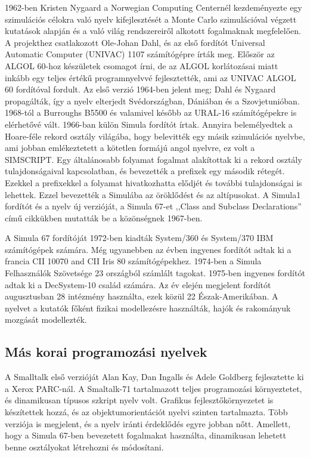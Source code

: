 \documentclass[]{thesis-ekf}
\theoremstyle{definition}
\begin{document}
	1962-ben Kristen Nygaard a Norwegian Computing Centernél kezdeményezte egy szimulációs célokra való nyelv kifejlesztését a Monte Carlo szimulációval végzett kutatások alapján és a való világ rendszereiről alkotott fogalmaknak megfelelően. A projekthez csatlakozott Ole-Johan Dahl, és az első fordítót Universal Automatic Computer (UNIVAC) 1107 számítógépre írták meg. Először az ALGOL 60-hoz készületek csomagot írni, de az ALGOL korlátozásai miatt inkább egy teljes értékű programnyelvvé fejlesztették, ami az UNIVAC ALGOL 60 fordítóval fordult. Az első verzió 1964-ben jelent meg; Dahl és Nygaard propagálták, így a nyelv elterjedt Svédországban, Dániában és a Szovjetunióban. 1968-tól a Burroughs B5500 és valamivel később az URAL-16 számítógépekre is elérhetővé vált. 1966-ban külön Simula fordítót írtak. Annyira belemélyedtek a Hoare-féle rekord osztály világába, hogy belevitték egy másik szimulációs nyelvbe, ami jobban emlékeztetett a kötetlen formájú angol nyelvre, ez volt a SIMSCRIPT. Egy általánosabb folyamat fogalmat alakítottak ki a rekord osztály tulajdonságaival kapcsolatban, és bevezették a prefixek egy második rétegét. Ezekkel a prefixekkel a folyamat hivatkozhatta elődjét és további tulajdonságai is lehettek. Ezzel bevezették a Simulába az öröklődést és az altípusokat. A Simula1 fordítót és a nyelv új verzióját, a Simula 67-et ,,Class and Subclass Declarations'' című cikkükben mutatták be a közönségnek 1967-ben.\cite{Holmevik}
	
	A Simula 67 fordítóját 1972-ben kiadták System/360 és System/370 IBM számítógépek számára. Még ugyanebben az évben ingyenes fordítót adtak ki a francia CII 10070 and CII Iris 80 számítógépekhez. 1974-ben a Simula Felhasználók Szövetsége 23 országból számlált tagokat. 1975-ben ingyenes fordítót adtak ki a DecSystem-10 család számára. Az év elején megjelent fordítót augusztusban 28 intézmény használta, ezek közül 22 Észak-Amerikában. A nyelvet a kutatók főként fizikai modellezésre használták, hajók és rakományuk mozgását modellezték.
	
	\subsection{Más korai programozási nyelvek}
	
	A Smalltalk első verzióját Alan Kay, Dan Ingalls és Adele Goldberg fejlesztette ki a Xerox PARC-nál. A Smaltalk-71 tartalmazott teljes programozási környeztetet, és dinamikusan típusos szkript nyelv volt. Grafikus fejlesztőkörnyezetet is készítettek hozzá, és az objektumorientációt nyelvi szinten tartalmazta. Több verziója is megjelent, és a nyelv iránti érdeklődés egyre jobban nőtt. Amellett, hogy a Simula 67-ben bevezetett fogalmakat használta, dinamikusan lehetett benne osztályokat létrehozni és módosítani.
	
\end{document}
